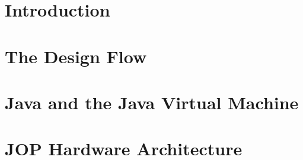 



%






\frontmatter \pagestyle{empty}



\pagestyle{scrheadings}

\tableofcontents \cleardoublepage

\mainmatter


\chapter{Introduction}
\label{chap:intro}
    






\chapter{The Design Flow}
\label{chap:build}




\chapter{Java and the Java Virtual Machine}
\label{chap:java}


%
%    

\chapter{JOP Hardware Architecture}
\label{chap:arch}

